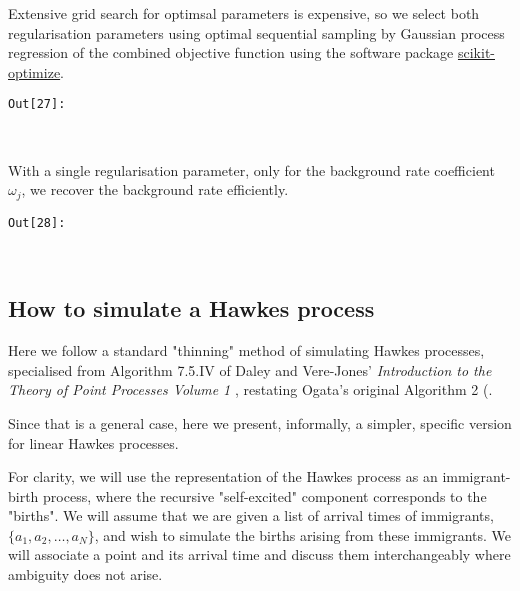 \documentclass[11pt]{article}
\begin{document}
    Extensive grid search for optimsal parameters is expensive, so we select
both regularisation parameters using optimal sequential sampling by
Gaussian process regression of the combined objective function
\cite{snoek_practical_2012} using the software package
\href{https://github.com/scikit-optimize/scikit-optimize}{scikit-optimize}.


\texttt{\color{outcolor}Out[{\color{outcolor}27}]:}
    
    \begin{center}
    \end{center}
    { \hspace*{\fill} \\}
    

    With a single regularisation parameter, only for the background rate
coefficient \(\omega_j\), we recover the background rate efficiently.


\texttt{\color{outcolor}Out[{\color{outcolor}28}]:}
    
    \begin{center}
    \end{center}
    { \hspace*{\fill} \\}
    

    \subsection{How to simulate a Hawkes
process}\label{how-to-simulate-a-hawkes-process}

Here we follow a standard "thinning" method of simulating Hawkes
processes, specialised from Algorithm 7.5.IV of Daley and Vere-Jones'
\emph{Introduction to the Theory of Point Processes Volume 1}
\cite{daley_introduction_2003}, restating Ogata's original Algorithm 2
(\cite{ogata_lewis_1981}.

Since that is a general case, here we present, informally, a simpler,
specific version for linear Hawkes processes.

For clarity, we will use the representation of the Hawkes process as an
immigrant-birth process, where the recursive "self-excited" component
corresponds to the "births". We will assume that we are given a list of
arrival times of immigrants, \(\{a_1,a_2,\dots,a_N\}\), and wish to
simulate the births arising from these immigrants. We will associate a
point and its arrival time and discuss them interchangeably where
ambiguity does not arise.
\end{document}
